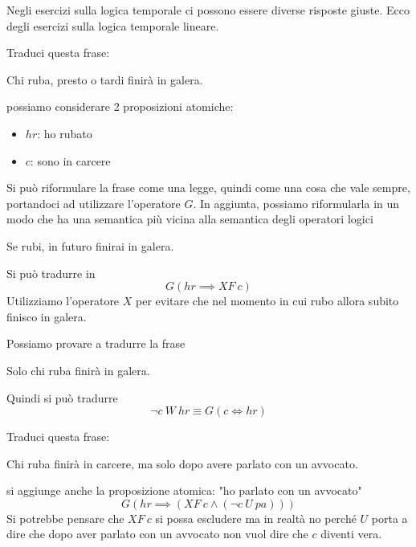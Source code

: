Negli esercizi sulla logica temporale ci possono essere diverse risposte giuste.
Ecco degli esercizi sulla logica temporale lineare.
\begin{esempio}
    Traduci questa frase:
    \begin{center}
        Chi ruba, presto o tardi finirà in galera.
    \end{center}
    possiamo considerare 2 proposizioni atomiche:
    \begin{itemize}
        \item $hr$: ho rubato
        \item $c$: sono in carcere
    \end{itemize}
    Si può riformulare la frase come una legge, quindi come una cosa che vale sempre,
    portandoci ad utilizzare l'operatore $G$. In aggiunta, possiamo riformularla
    in un modo che ha una semantica più vicina alla semantica degli operatori logici
    \begin{center}
        Se rubi, in futuro finirai in galera.
    \end{center}
    Si può tradurre in
    \begin{equation}
        G(hr\implies XF \ c)
    \end{equation}
    Utilizziamo l'operatore $X$ per evitare che nel momento in cui rubo allora
    subito finisco in galera.

    Possiamo provare a tradurre la frase
    \begin{center}
        Solo chi ruba finirà in galera.
    \end{center}
    Quindi si può tradurre
    \begin{equation}
        \lnot c \ W \ hr \equiv G(c \iff hr)
    \end{equation}
\end{esempio}
\begin{esempio}
    Traduci questa frase:
    \begin{center}
        Chi ruba finirà in carcere, ma solo dopo avere parlato con un avvocato.
    \end{center}
    si aggiunge anche la proposizione atomica: "ho parlato con un avvocato"
    \begin{equation}
        G(hr\implies (XF \ c \land (\lnot c \ U \ pa)))
    \end{equation}
    Si potrebbe pensare che $XF \ c$ si possa escludere ma in realtà no perché
    $U$ porta a dire che dopo aver parlato con un avvocato non vuol dire che $c$
    diventi vera.
\end{esempio}
